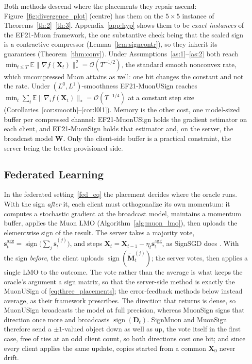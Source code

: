 Both methods descend where the placements they repair ascend: Figure~\ref{fig:divergence_plot} (centre) has them on the $5\times5$ instance of Theorems~\ref{th:2}--\ref{th:3}. Appendix~\ref{app:hyp} shows them to be \emph{exact instances} of the EF21-Muon framework, the one substantive check being that the scaled sign is a contractive compressor (Lemma~\ref{lem:signcontr}), so they inherit its guarantees (Theorem~\ref{thm:conv}). Under Assumptions~\ref{as:1}--\ref{as:2} both reach $\min_{t\le T}\mathbb{E}\|\nabla f(\mathbf{X}_t)\|_*^2=\mathcal{O}(T^{-1/2})$, the standard smooth nonconvex rate, which uncompressed Muon attains as well: one bit changes the constant and not the rate. Under $(L^0,L^1)$-smoothness EF21-MuonUSign reaches $\min_t\sum_i\mathbb{E}\|\nabla_i f(\mathbf{X}_t)\|_*=\mathcal{O}(T^{-1/4})$ at a constant step size (Corollaries~\ref{cor:smooth}--\ref{cor:l0l1}). Memory is the other cost, one model-sized buffer per compressed channel: EF21-MuonUSign holds the gradient estimator on each client, and EF21-MuonSign holds that estimator and, on the server, the broadcast model $\mathbf{W}$. Only the client-side buffer is a practical constraint, the server being the better provisioned side.


\subsection{Federated Learning}
In the federated setting~\eqref{fed_eq} the placement decides where the oracle runs. With the sign \emph{after} it, each client must orthogonalize its own momentum: it computes a stochastic gradient at the broadcast model, maintains a momentum buffer, applies the Muon LMO (Algorithm~\ref{alg:muon_lmo}), then uploads the elementwise sign of the result. The server takes a majority vote, $\mathbf{s}_t^{\mathrm{agg}}=\operatorname{sign}\bigl(\sum_{j} \mathbf{s}_t^{(j)}\bigr)$, and steps $\mathbf{X}_t=\mathbf{X}_{t-1}-\eta_t\mathbf{s}_t^{\mathrm{agg}}$, as SignSGD does \citep{bernstein2019signsgdmajority}. With the sign \emph{before}, the client uploads $\operatorname{sign}(\tilde{\mathbf{M}}_t^{(j)})$; the server votes, then applies a single LMO to the outcome. The vote rather than the average is what keeps the oracle's argument a sign matrix, so that the server-side method is exactly the MuonUSign of \eqref{eq:three_placements}; the error-feedback methods below instead average, as their framework prescribes. The direction that returns is dense, so MuonUSign broadcasts the model at full precision, whereas MuonSign signs that direction once more and broadcasts $\operatorname{sign}(\mathbf{D}_t)$. SignMuon and MuonSign therefore send a $\pm1$-valued object down as well as up, the vote itself in the first case, free of ties at an odd client count, so both directions cost one bit; and since every client applies the same update, copies started from a common $\mathbf{X}_0$ never drift.

